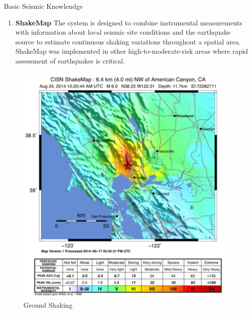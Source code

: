 \documentclass{beamer}
\newcounter{saveenumi}
\newcommand{\conti}{\setcounter{enumi}{\value{saveenumi}}}
\begin{document}
	\begin{frame}[t]{Basic Seismic Knowlendge}
		\begin{enumerate}
			\conti
			\item \textbf{ShakeMap} The system is designed to combine instrumental measurements with information about local seismic site conditions and the earthquake source to estimate continuous shaking variations throughout a 
			spatial area. ShakeMap was implemented in other high-to-moderate-risk areas where rapid assessment of earthquakes is critical.
		\end{enumerate}
		\begin{figure}
			\centering
			\includegraphics[scale=0.4]{example.png}
			\caption{Ground Shaking}
		\end{figure}
		
	\end{frame}
\end{document}
